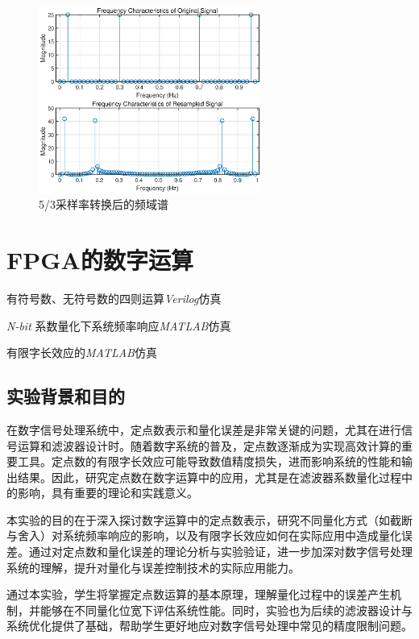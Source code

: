 \documentclass[lang=cn,newtx,10pt,scheme=chinese]{elegantbook}
\begin{document}
\begin{figure}[htbp]
  \centering
  \includegraphics[width=0.65\textwidth]{figure/fig6.eps}
  \caption{5/3采样率转换后的频域谱}
  \label{fig:fig6}
\end{figure}
\chapter{FPGA的数字运算}
\begin{introduction}
  \item 有符号数、无符号数的四则运算\textit{Verilog}仿真
  \item \textit{N-bit} 系数量化下系统频率响应\textit{MATLAB}仿真
  \item 有限字长效应的\textit{MATLAB}仿真
\end{introduction}
\section{实验背景和目的}

在数字信号处理系统中，定点数表示和量化误差是非常关键的问题，尤其在进行信号运算和滤波器设计时。随着数字系统的普及，定点数逐渐成为实现高效计算的重要工具。定点数的有限字长效应可能导致数值精度损失，进而影响系统的性能和输出结果。因此，研究定点数在数字运算中的应用，尤其是在滤波器系数量化过程中的影响，具有重要的理论和实践意义。

本实验的目的在于深入探讨数字运算中的定点数表示，研究不同量化方式（如截断与舍入）对系统频率响应的影响，以及有限字长效应如何在实际应用中造成量化误差。通过对定点数和量化误差的理论分析与实验验证，进一步加深对数字信号处理系统的理解，提升对量化与误差控制技术的实际应用能力。

通过本实验，学生将掌握定点数运算的基本原理，理解量化过程中的误差产生机制，并能够在不同量化位宽下评估系统性能。同时，实验也为后续的滤波器设计与系统优化提供了基础，帮助学生更好地应对数字信号处理中常见的精度限制问题。
\end{document}
